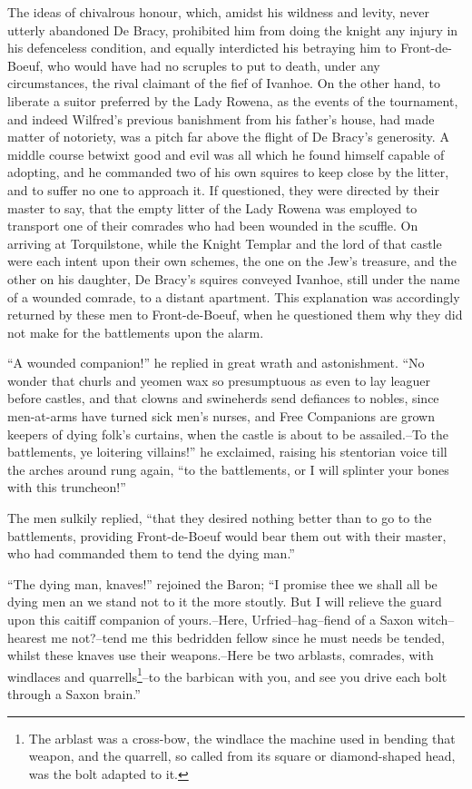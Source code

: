 The ideas of chivalrous honour, which, amidst his wildness and levity,
never utterly abandoned De Bracy, prohibited him from doing the knight
any injury in his defenceless condition, and equally interdicted his
betraying him to Front-de-Boeuf, who would have had no scruples to put
to death, under any circumstances, the rival claimant of the fief of
Ivanhoe. On the other hand, to liberate a suitor preferred by the Lady
Rowena, as the events of the tournament, and indeed Wilfred's previous
banishment from his father's house, had made matter of notoriety, was a
pitch far above the flight of De Bracy's generosity. A middle course
betwixt good and evil was all which he found himself capable of
adopting, and he commanded two of his own squires to keep close by the
litter, and to suffer no one to approach it. If questioned, they were
directed by their master to say, that the empty litter of the Lady
Rowena was employed to transport one of their comrades who had been
wounded in the scuffle. On arriving at Torquilstone, while the Knight
Templar and the lord of that castle were each intent upon their own
schemes, the one on the Jew's treasure, and the other on his daughter,
De Bracy's squires conveyed Ivanhoe, still under the name of a wounded
comrade, to a distant apartment. This explanation was accordingly
returned by these men to Front-de-Boeuf, when he questioned them why
they did not make for the battlements upon the alarm.

``A wounded companion!'' he replied in great wrath and astonishment.
``No wonder that churls and yeomen wax so presumptuous as even to lay
leaguer before castles, and that clowns and swineherds send defiances to
nobles, since men-at-arms have turned sick men's nurses, and Free
Companions are grown keepers of dying folk's curtains, when the castle
is about to be assailed.--To the battlements, ye loitering villains!''
he exclaimed, raising his stentorian voice till the arches around rung
again, ``to the battlements, or I will splinter your bones with this
truncheon!''

The men sulkily replied, ``that they desired nothing better than to go
to the battlements, providing Front-de-Boeuf would bear them out with
their master, who had commanded them to tend the dying man.''

``The dying man, knaves!'' rejoined the Baron; ``I promise thee we shall
all be dying men an we stand not to it the more stoutly. But I will
relieve the guard upon this caitiff companion of yours.--Here,
Urfried--hag--fiend of a Saxon witch--hearest me not?--tend me this
bedridden fellow since he must needs be tended, whilst these knaves use
their weapons.--Here be two arblasts, comrades, with windlaces and
quarrells\footnote{The arblast was a cross-bow, the windlace the machine
used in bending that weapon, and the quarrell, so called from its square
or diamond-shaped head, was the bolt adapted to it.}--to the barbican with
you, and see you drive each bolt through a Saxon brain.''

